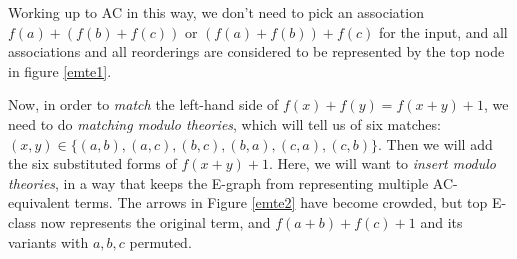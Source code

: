 \documentclass[12pt,a4paper,twoside,openright]{report}
\numberwithin{equation}{chapter}		%
\numberwithin{figure}{chapter}			%
\numberwithin{table}{chapter}			%
\theoremstyle{definition}
\theoremstyle{plain}
\begin{document}
Working up to AC in this way, we don't need to pick an association $f(a) + (f(b) + f(c))$ or $(f(a) + f(b)) + f(c)$ for the input, and all associations and all reorderings are considered to be represented by the top node in figure \ref{emte1}.

Now, in order to \emph{match} the left-hand side of $f(x) + f(y) = f(x + y) + 1$, we need to do \emph{matching modulo theories}, which will tell us of six matches: $(x, y) \in \{(a, b), (a, c), (b, c), (b, a), (c, a), (c, b)\}$. Then we will add the six substituted forms of $f(x + y) + 1$. Here, we will want to \emph{insert modulo theories}, in a way that keeps the E-graph from representing multiple AC-equivalent terms. The arrows in Figure \ref{emte2} have become crowded, but top E-class now represents the original term, and $f(a + b) + f(c) + 1$ and its variants with $a,b,c$ permuted.
\end{document}
